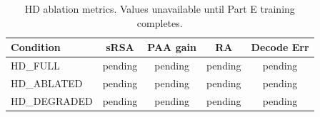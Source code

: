 \begin{table}[h]
\centering
\caption{HD ablation metrics. Values unavailable until Part E training completes.}
\begin{tabular}{lcccc}
\toprule
Condition & sRSA & PAA gain & RA & Decode Err \\
\midrule
HD\_FULL & pending & pending & pending & pending \\
HD\_ABLATED & pending & pending & pending & pending \\
HD\_DEGRADED & pending & pending & pending & pending \\
\bottomrule
\end{tabular}
\end{table}
